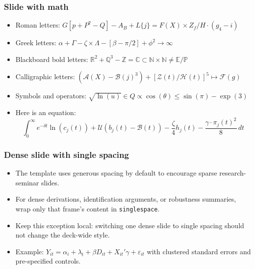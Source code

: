\expandafter\documentclass\expandafter[\presentationclassoptions]{beamer}
\begin{document}
\begin{frame}
  \frametitle{Slide with math}
  \begin{itemize}
    \item Roman letters: $G[p + P^7-Q] - A_B + L\{j\} = F(X) \times Z_f/H \cdot (g_4 - i)$
    \item Greek letters: $\alpha + \Gamma - \zeta \times \Lambda - [\beta - \pi/2] + \phi^2 \to \infty$
    \item Blackboard bold letters: $\mathbb{R}^2 + \mathbb{Q}^3 - \mathbb{Z} = \mathbb{C} \subset \mathbb{N} \times \mathbb{N} \neq \mathbb{E} / \mathbb{P}$
    \item Calligraphic letters: $(\mathcal{A}(X) - \mathcal{B}(j)^3) + [\mathcal{Z}(t) / \mathcal{H}(t)]^5 \mapsto \mathcal{F}(g) $
    \item Symbols and operators: $\sqrt{\ln(u)} \in Q \propto \cos(\theta) \leq \sin(\pi) - \exp(3)$
    \item Here is an equation:
      \begin{equation*}
        \int_{0}^{\infty}e^{-\delta t} \ln(c_{j}(t))+ \mathcal{U}(b_{j}(t) - \mathcal{B}(t))- \frac{\zeta}{4} h_{j}(t) -\frac{\gamma \cdot \pi_{j}(t)^2}{8}\,dt
      \end{equation*}
  \end{itemize}
\end{frame}

\begin{frame}
  \frametitle{Dense slide with single spacing}
  \begin{singlespace}
    \begin{itemize}
      \item The template uses generous spacing by default to encourage sparse research-seminar slides.
      \item For dense derivations, identification arguments, or robustness summaries, wrap only that frame's content in \texttt{singlespace}.
      \item Keep this exception local: switching one dense slide to single spacing should not change the deck-wide style.
      \item Example: $Y_{it}=\alpha_i+\lambda_t+\beta D_{it}+X_{it}'\gamma+\varepsilon_{it}$ with clustered standard errors and pre-specified controls.
    \end{itemize}
  \end{singlespace}
\end{frame}
\end{document}
